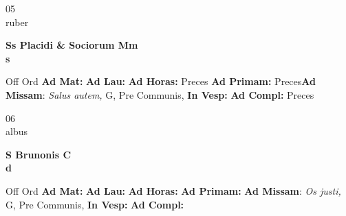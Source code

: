 \documentclass[10pt, openany]{book}
\begin{document}
    \begin{center}
        \begin{minipage}{3.5in}
            \vspace{2em}
            \begin{minipage}{0.5in}
                {\Huge 05} \\
                {\normalsize ruber}
            \end{minipage}
            \begin{minipage}{3.0in}
                \textbf{ \large Ss Placidi \& Sociorum Mm \\
                \textnormal{\normalsize s}}

            \end{minipage}
            \begin{justify}Off Ord
                \textbf{Ad Mat: }
                \textbf{Ad Lau: }
                \textbf{Ad Horas: }Preces
                \textbf{Ad Primam: }Preces\textbf{Ad Missam}: \textit{Salus autem,} G, Pre Communis, 
                \textbf{In Vesp: }
                \textbf{Ad Compl: }Preces
            \end{justify}
        \end{minipage}
    \end{center}

    \begin{center}
        \begin{minipage}{3.5in}
            \vspace{2em}
            \begin{minipage}{0.5in}
                {\Huge 06} \\
                {\normalsize albus}
            \end{minipage}
            \begin{minipage}{3.0in}
                \textbf{ \large S Brunonis C \\
                \textnormal{\normalsize d}}

            \end{minipage}
            \begin{justify}Off Ord
                \textbf{Ad Mat: }
                \textbf{Ad Lau: }
                \textbf{Ad Horas: }
                \textbf{Ad Primam: }\textbf{Ad Missam}: \textit{Os justi,} G, Pre Communis, 
                \textbf{In Vesp: }
                \textbf{Ad Compl: }
            \end{justify}
        \end{minipage}
    \end{center}
\end{document}
